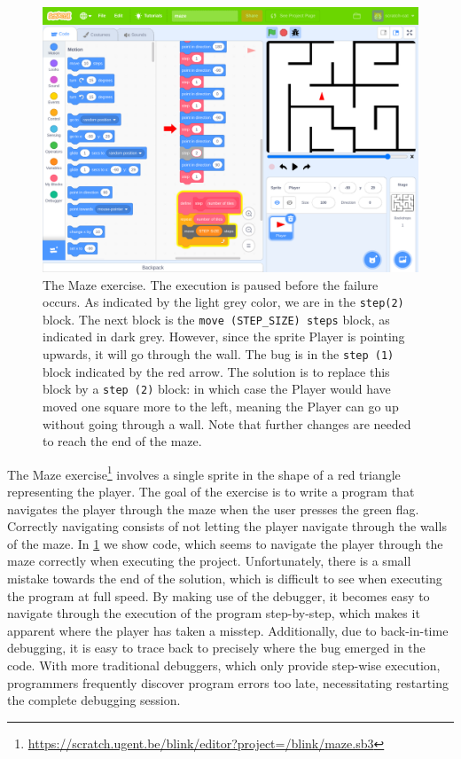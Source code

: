 \documentclass[../main]{subfiles}
\begin{document}
\begin{figure}
    \begin{wide}
        \includegraphics[width=\linewidth]{maze}
    \end{wide}
    \caption{
        The Maze exercise.
        The execution is paused before the failure occurs.
        As indicated by the light grey color, we are in the \texttt{step(2)} block.
        The next block is the \texttt{move (STEP\_SIZE) steps} block, as indicated in dark grey.
        However, since the sprite Player is pointing upwards, it will go through the wall.
        The bug is in the \texttt{step (1)} block indicated by the red arrow.
        The solution is to replace this block by a \texttt{step (2)} block: in which case the Player would have moved one square more to the left, meaning the Player can go up without going through a wall.
        Note that further changes are needed to reach the end of the maze.
    }
    \label{fig:maze}
\end{figure}

The Maze exercise\footnote{\url{https://scratch.ugent.be/blink/editor?project=/blink/maze.sb3}} involves a single sprite in the shape of a red triangle representing the player.
The goal of the exercise is to write a program that navigates the player through the maze when the user presses the green flag.
Correctly navigating consists of not letting the player navigate through the walls of the maze.
In \cref{fig:maze} we show code, which seems to navigate the player through the maze correctly when executing the project.
Unfortunately, there is a small mistake towards the end of the solution, which is difficult to see when executing the program at full speed.
By making use of the debugger, it becomes easy to navigate through the execution of the program step-by-step, which makes it apparent where the player has taken a misstep.
Additionally, due to back-in-time debugging, it is easy to trace back to precisely where the bug emerged in the code.
With more traditional debuggers, which only provide step-wise execution, programmers frequently discover program errors too late, necessitating restarting the complete debugging session.
\end{document}
